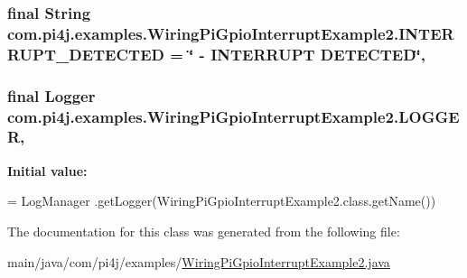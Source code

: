 \subsubsection[{I\+N\+T\+E\+R\+R\+U\+P\+T\+\_\+\+D\+E\+T\+E\+C\+T\+E\+D}]{\setlength{\rightskip}{0pt plus 5cm}final String com.\+pi4j.\+examples.\+Wiring\+Pi\+Gpio\+Interrupt\+Example2.\+I\+N\+T\+E\+R\+R\+U\+P\+T\+\_\+\+D\+E\+T\+E\+C\+T\+E\+D = \char`\"{} -\/ I\+N\+T\+E\+R\+R\+U\+P\+T D\+E\+T\+E\+C\+T\+E\+D\char`\"{}\hspace{0.3cm}{\ttfamily [static]}, {\ttfamily [private]}}\label{classcom_1_1pi4j_1_1examples_1_1WiringPiGpioInterruptExample2_a9b049c8a82cde617b6e7ad5a5f1ff724}
\hypertarget{classcom_1_1pi4j_1_1examples_1_1WiringPiGpioInterruptExample2_a758943cc0773bdc2ab72f5fb3a2a495b}{}
\subsubsection[{L\+O\+G\+G\+E\+R}]{\setlength{\rightskip}{0pt plus 5cm}final Logger com.\+pi4j.\+examples.\+Wiring\+Pi\+Gpio\+Interrupt\+Example2.\+L\+O\+G\+G\+E\+R\hspace{0.3cm}{\ttfamily [static]}, {\ttfamily [private]}}\label{classcom_1_1pi4j_1_1examples_1_1WiringPiGpioInterruptExample2_a758943cc0773bdc2ab72f5fb3a2a495b}
{\bfseries Initial value\+:}
\begin{DoxyCode}
= LogManager
            .getLogger(WiringPiGpioInterruptExample2.class.getName())
\end{DoxyCode}


The documentation for this class was generated from the following file\+:\begin{DoxyCompactItemize}
\item 
main/java/com/pi4j/examples/\hyperlink{WiringPiGpioInterruptExample2_8java}{Wiring\+Pi\+Gpio\+Interrupt\+Example2.\+java}\end{DoxyCompactItemize}
